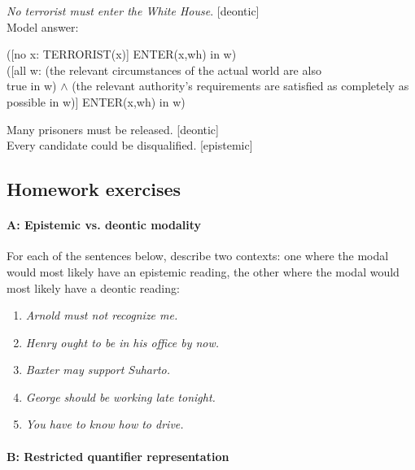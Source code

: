 \ea
\ea \textit{No terrorist must enter the White House}.  [deontic]\\
Model answer:\\
\begin{xlisti} \ex{}   ([no x: TERRORIST(x)] ENTER(x,wh) in w)\\
\ex\relax [no x: TERRORIST(x)] ([all w: (the relevant circumstances of the actual world are also \\
  true in w) $\wedge$ (the relevant authority’s requirements are satisfied as completely as \\
  possible in w)] ENTER(x,wh) in w)
\end{xlisti}
\ex Many prisoners must be released.  [deontic]\\
\ex Every candidate could be disqualified.  [epistemic]
\z
\z
{}

\subsection*{Homework exercises}\label{sec:}
\paragraph{A: Epistemic vs. deontic modality}

For each of the sentences below, describe two contexts: one where the modal would most likely have an epistemic reading, the other where the modal would most likely have a deontic reading:

\begin{enumerate}
\item \itshape Arnold must not recognize me.
\item \itshape Henry ought to be in his office by now.
\item \itshape Baxter may support Suharto.
\item \itshape George should be working late tonight.
\item \itshape You have to know how to drive.
\end{enumerate}
\paragraph{B: Restricted quantifier representation}

